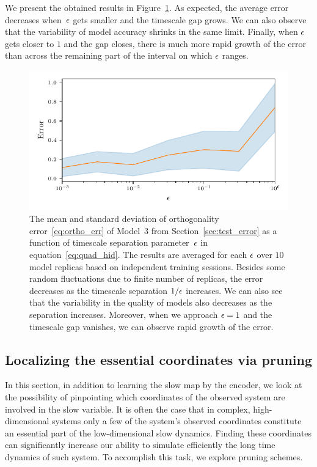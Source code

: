 \documentclass{article}
\begin{document}
We present the obtained results in Figure~\ref{fig:quad4d_eps_err_derivatives}. As expected, the average error decreases when~$\epsilon$ gets smaller and the timescale gap grows. We can also observe that the variability of model accuracy shrinks in the same limit. Finally, when $\epsilon$ gets closer to $1$ and the gap closes, there is much more rapid growth of the error than across the remaining part of the interval on which $\epsilon$ ranges.

\begin{figure}
    \centering
    \includegraphics[]{figs/quad4d_eps_err_derivatives.pdf}
    \caption{
    The mean and standard deviation of orthogonality error~\eqref{eq:ortho_err} of Model~3 from Section~\ref{sec:test_error} as a function of timescale separation parameter~$\epsilon$ in equation~\eqref{eq:quad_hid}. The results are averaged for each $\epsilon$ over $10$ model replicas based on independent training sessions. Besides some random fluctuations due to finite number of replicas, the error decreases as the timescale separation $1/\epsilon$ increases. We can also see that the variability in the quality of models also decreases as the separation increases. Moreover, when we approach $\epsilon=1$ and the timescale gap vanishes, we can observe rapid growth of the error.
    }
    \label{fig:quad4d_eps_err_derivatives}
\end{figure}

\subsection{Localizing the essential coordinates via pruning}
\label{sec:essential_coords}
In this section, in addition to learning the slow map by the encoder, we look at the possibility of pinpointing which coordinates of the observed system are involved in the slow variable. It is often the case that in complex, high-dimensional systems only a few of the system's observed coordinates constitute an essential part of the low-dimensional slow dynamics. Finding these coordinates can significantly increase our ability to simulate efficiently the long time dynamics of such system. To accomplish this task, we explore pruning schemes.
\end{document}
